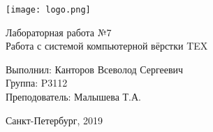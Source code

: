 \begin{center}
	\texttt{[image: logo.png]}
	\vspace{5 cm}
	
	\LARGE Лабораторная работа №7\\
	Работа с системой компьютерной вёрстки TEX
	\vfill
\end{center}
\begin{flushright}
	\large
	Выполнил: Канторов Всеволод Сергеевич\\
	Группа: P3112\\
	Преподователь: Малышева Т.А.\\
	\vfill
\end{flushright}

\begin{center}
	\large Санкт-Петербург, 2019
\end{center}

\newpage
